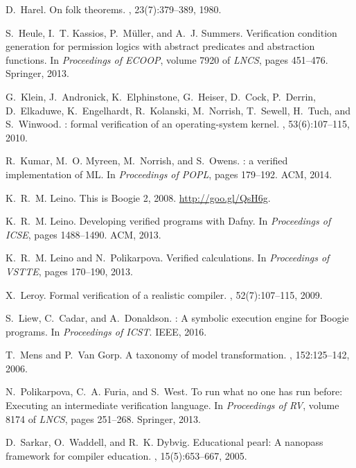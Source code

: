 \documentclass[a4paper,final]{llncs}
\begin{document}
\begin{thebibliography}{10}
D.~Harel.
\newblock On folk theorems.
, 23(7):379--389, 1980.

S.~Heule, I.~T. Kassios, P.~M{\"{u}}ller, and A.~J. Summers.
\newblock Verification condition generation for permission logics with abstract
  predicates and abstraction functions.
\newblock In {\em Proceedings of {ECOOP}}, volume 7920 of {\em LNCS}, pages
  451--476. Springer, 2013.

G.~Klein, J.~Andronick, K.~Elphinstone, G.~Heiser, D.~Cock, P.~Derrin,
  D.~Elkaduwe, K.~Engelhardt, R.~Kolanski, M.~Norrish, T.~Sewell, H.~Tuch, and
  S.~Winwood.
: formal verification of an operating-system kernel.
, 53(6):107--115, 2010.

R.~Kumar, M.~O. Myreen, M.~Norrish, and S.~Owens.
: a verified implementation of {ML}.
\newblock In {\em Proceedings of POPL}, pages 179--192. {ACM}, 2014.

K.~R.~M. Leino.
\newblock This is {B}oogie 2, 2008.
\newblock \url{http://goo.gl/QsH6g}.

K.~R.~M. Leino.
\newblock Developing verified programs with {Dafny}.
\newblock In {\em Proceedings of ICSE}, pages 1488--1490. ACM, 2013.

K.~R.~M. Leino and N.~Polikarpova.
\newblock Verified calculations.
\newblock In {\em Proceedings of VSTTE}, pages 170--190, 2013.

X.~Leroy.
\newblock Formal verification of a realistic compiler.
, 52(7):107--115, 2009.

S.~Liew, C.~Cadar, and A.~Donaldson.
: A symbolic execution engine for {Boogie} programs.
\newblock In {\em Proceedings of ICST}. IEEE, 2016.

T.~Mens and P.~{Van Gorp}.
\newblock A taxonomy of model transformation.
, 152:125--142, 2006.

N.~Polikarpova, C.~A. Furia, and S.~West.
\newblock To run what no one has run before: Executing an intermediate
  verification language.
\newblock In {\em Proceedings of RV}, volume 8174 of {\em LNCS}, pages
  251--268. Springer, 2013.

D.~Sarkar, O.~Waddell, and R.~K. Dybvig.
\newblock Educational pearl: {A} nanopass framework for compiler education.
, 15(5):653--667, 2005.


\end{thebibliography}
\end{document}
